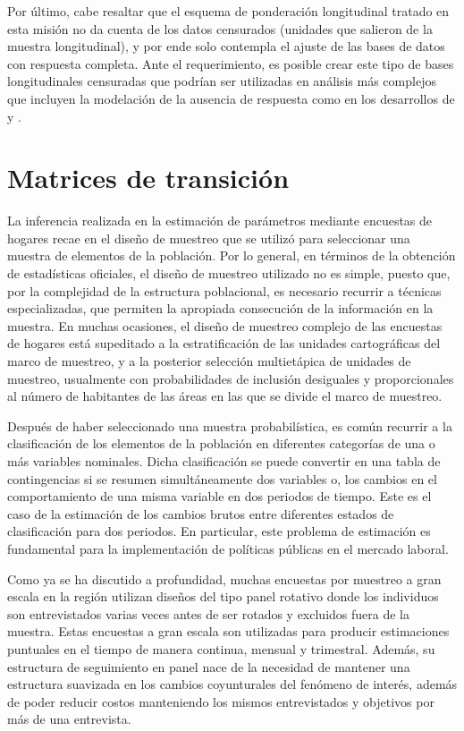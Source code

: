 \documentclass[
  10pt,
  spanish,
]{book}
\begin{document}
Por último, cabe resaltar que el esquema de ponderación longitudinal tratado en esta misión no da cuenta de los datos censurados (unidades que salieron de la muestra longitudinal), y por ende solo contempla el ajuste de las bases de datos con respuesta completa. Ante el requerimiento, es posible crear este tipo de bases longitudinales censuradas que podrían ser utilizadas en análisis más complejos que incluyen la modelación de la ausencia de respuesta como en los desarrollos de \citet{Feinberg_Stasny_1983} y \citet{Gutierrez_Trujillo_Silva_2014}.

\hypertarget{matrices-de-transiciuxf3n}{%
\section{Matrices de transición}\label{matrices-de-transiciuxf3n}}

La inferencia realizada en la estimación de parámetros mediante encuestas de hogares recae en el diseño de muestreo que se utilizó para seleccionar una muestra de elementos de la población. Por lo general, en términos de la obtención de estadísticas oficiales, el diseño de muestreo utilizado no es simple, puesto que, por la complejidad de la estructura poblacional, es necesario recurrir a técnicas especializadas, que permiten la apropiada consecución de la información en la muestra. En muchas ocasiones, el diseño de muestreo complejo de las encuestas de hogares está supeditado a la estratificación de las unidades cartográficas del marco de muestreo, y a la posterior selección multietápica de unidades de muestreo, usualmente con probabilidades de inclusión desiguales y proporcionales al número de habitantes de las áreas en las que se divide el marco de muestreo.

Después de haber seleccionado una muestra probabilística, es común recurrir a la clasificación de los elementos de la población en diferentes categorías de una o más variables nominales. Dicha clasificación se puede convertir en una tabla de contingencias si se resumen simultáneamente dos variables o, los cambios en el comportamiento de una misma variable en dos periodos de tiempo. Este es el caso de la estimación de los cambios brutos entre diferentes estados de clasificación para dos periodos. En particular, este problema de estimación es fundamental para la implementación de políticas públicas en el mercado laboral.

Como ya se ha discutido a profundidad, muchas encuestas por muestreo a gran escala en la región utilizan diseños del tipo panel rotativo donde los individuos son entrevistados varias veces antes de ser rotados y excluidos fuera de la muestra. Estas encuestas a gran escala son utilizadas para producir estimaciones puntuales en el tiempo de manera continua, mensual y trimestral. Además, su estructura de seguimiento en panel nace de la necesidad de mantener una estructura suavizada en los cambios coyunturales del fenómeno de interés, además de poder reducir costos manteniendo los mismos entrevistados y objetivos por más de una entrevista.
\end{document}
